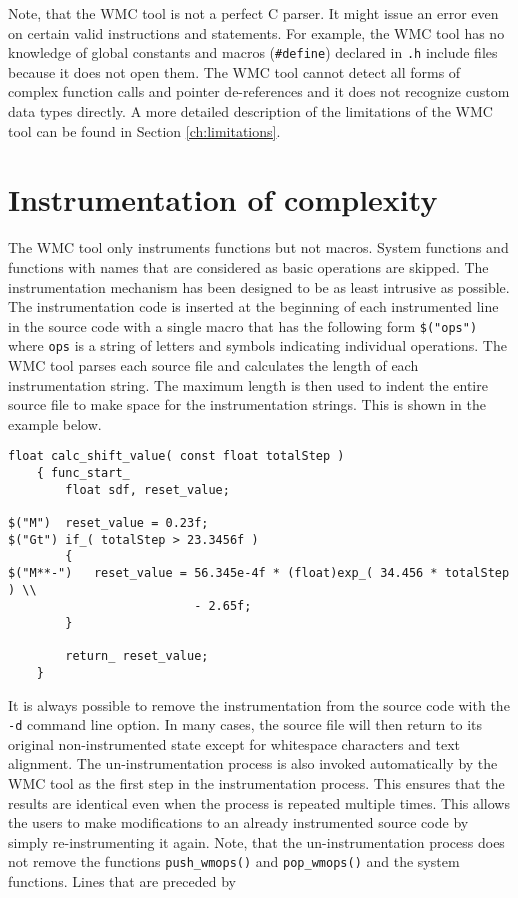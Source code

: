 Note, that the WMC tool is not a perfect C parser. It might issue an error even on certain valid instructions and statements. For example, the WMC tool has no knowledge of global constants and macros (\verb|#define|) declared in \verb|.h| include files because it does not open them. The WMC tool cannot detect all forms of complex function calls and pointer de-references and it does not recognize custom data types directly. A more detailed description of the limitations of the WMC tool can be found in Section \ref{ch:limitations}.

\section{Instrumentation of complexity}
\label{ch:instrumentation_of_complexity}

The WMC tool only instruments functions but not macros. System functions and functions with names that are considered as basic operations are skipped. The instrumentation mechanism has been designed to be as least intrusive as possible. The instrumentation code is inserted at the beginning of each instrumented line in the source code with a single macro that has the following form \verb|$("ops")| where \verb|ops| is a string of letters and symbols indicating individual operations. The WMC tool parses each source file and calculates the length of each instrumentation string. The maximum length is then used to indent the entire source file to make space for the instrumentation strings. This is shown in the example below. 

\begin{Verbatim}[fontsize=\small]
    float calc_shift_value( const float totalStep )
    { func_start_
        float sdf, reset_value;

$("M")  reset_value = 0.23f;
$("Gt") if_( totalStep > 23.3456f )  
        {
$("M**-")   reset_value = 56.345e-4f * (float)exp_( 34.456 * totalStep ) \\
                          - 2.65f;
        }

        return_ reset_value;
    }
\end{Verbatim}

It is always possible to remove the instrumentation from the source code with the \verb|-d| command line option. In many cases, the source file will then return to its original non-instrumented state except for whitespace characters and text alignment. The un-instrumentation process is also invoked automatically by the WMC tool as the first step in the instrumentation process. This ensures that the results are identical even when the process is repeated multiple times. This allows the users to make modifications to an already instrumented source code by simply re-instrumenting it again. Note, that the un-instrumentation process does not remove the functions \verb|push_wmops()| and \verb|pop_wmops()| and the system functions. Lines that are preceded by


